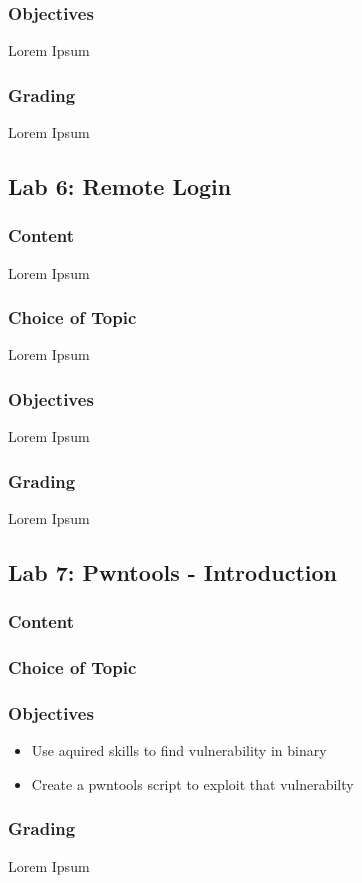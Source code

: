 \subsubsection*{Objectives}
Lorem Ipsum
\subsubsection*{Grading}
Lorem Ipsum

\subsection{Lab 6: Remote Login}
\subsubsection*{Content}
Lorem Ipsum
\subsubsection*{Choice of Topic}
Lorem Ipsum
\subsubsection*{Objectives}
Lorem Ipsum
\subsubsection*{Grading}
Lorem Ipsum

\subsection{Lab 7: Pwntools - Introduction}
\subsubsection*{Content}

\subsubsection*{Choice of Topic}

\subsubsection*{Objectives}
\begin{itemize}
    \item Use aquired skills to find vulnerability in binary
    \item Create a pwntools script to exploit that vulnerabilty
\end{itemize}
\subsubsection*{Grading}
Lorem Ipsum
